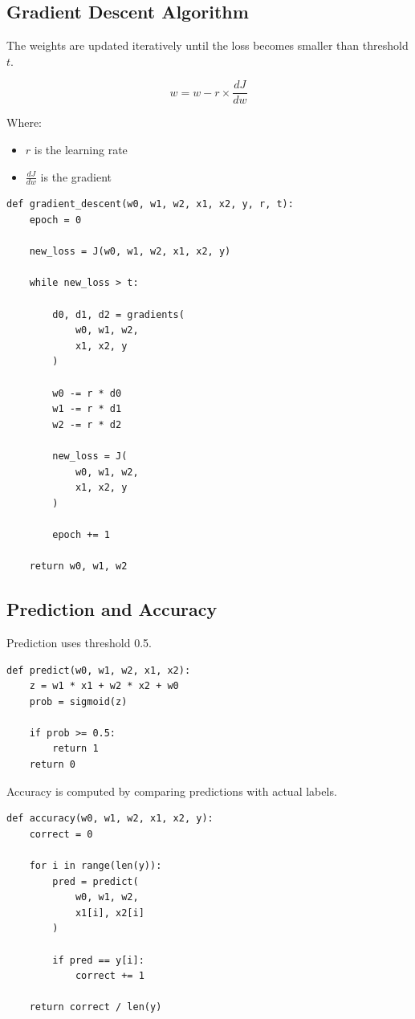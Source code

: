 \documentclass{article}
\begin{document}
\subsection{Gradient Descent Algorithm}

The weights are updated iteratively until the loss becomes smaller than threshold $t$.

\[
w = w - r \times \frac{dJ}{dw}
\]

Where:

\begin{itemize}
    \item $r$ is the learning rate
    \item $\frac{dJ}{dw}$ is the gradient
\end{itemize}

\begin{lstlisting}
def gradient_descent(w0, w1, w2, x1, x2, y, r, t):
    epoch = 0

    new_loss = J(w0, w1, w2, x1, x2, y)

    while new_loss > t:

        d0, d1, d2 = gradients(
            w0, w1, w2,
            x1, x2, y
        )

        w0 -= r * d0
        w1 -= r * d1
        w2 -= r * d2

        new_loss = J(
            w0, w1, w2,
            x1, x2, y
        )

        epoch += 1

    return w0, w1, w2
\end{lstlisting}

\subsection{Prediction and Accuracy}

Prediction uses threshold 0.5.

\begin{lstlisting}
def predict(w0, w1, w2, x1, x2):
    z = w1 * x1 + w2 * x2 + w0
    prob = sigmoid(z)

    if prob >= 0.5:
        return 1
    return 0
\end{lstlisting}

Accuracy is computed by comparing predictions with actual labels.

\begin{lstlisting}
def accuracy(w0, w1, w2, x1, x2, y):
    correct = 0

    for i in range(len(y)):
        pred = predict(
            w0, w1, w2,
            x1[i], x2[i]
        )

        if pred == y[i]:
            correct += 1

    return correct / len(y)
\end{lstlisting}
\end{document}
